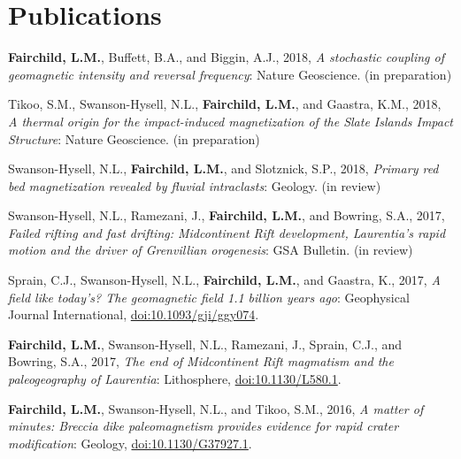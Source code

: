 \documentclass[11pt,a4paper,sans]{moderncv}
\begin{document}
\section{Publications}
\vspace{6pt}
\begin{etaremune}[itemsep=3pt]

    \item{\textbf{Fairchild, L.M.}, Buffett, B.A., and Biggin, A.J., 2018,
            \textit{A stochastic coupling of geomagnetic intensity and reversal
        frequency}: Nature Geoscience. (in preparation)}

    \item{Tikoo, S.M., Swanson-Hysell, N.L., \textbf{Fairchild, L.M.}, and
            Gaastra, K.M., 2018, \textit{A thermal origin for the impact-induced
            magnetization of the Slate Islands Impact Structure}: Nature
        Geoscience. (in preparation)}

    \item{Swanson-Hysell, N.L., \textbf{Fairchild, L.M.}, and Slotznick, S.P.,
            2018, \textit{Primary red bed magnetization revealed by fluvial
        intraclasts}: Geology. (in review)}

    \item{Swanson-Hysell, N.L., Ramezani, J., \textbf{Fairchild, L.M.}, and
            Bowring, S.A., 2017, \textit{Failed rifting and fast drifting:
                Midcontinent Rift
                development, Laurentia's rapid motion and the driver of
        Grenvillian orogenesis}: GSA Bulletin. (in review)}

    \item{Sprain, C.J., Swanson-Hysell, N.L., \textbf{Fairchild, L.M.}, and
            Gaastra, K., 2017, \textit{A field like today's? The geomagnetic
            field 1.1 billion years ago}: Geophysical Journal International,
            {\color{cyan}\href{https://doi.org/10.1093/gji/ggy074}
        {doi:10.1093/gji/ggy074}}.}

    \item{\textbf{Fairchild, L.M.}, Swanson-Hysell, N.L., Ramezani, J., Sprain,
            C.J., and Bowring, S.A., 2017, \textit{The end of Midcontinent Rift
            magmatism and the paleogeography of Laurentia}: Lithosphere,
            {\color{cyan}\href{https://doi.org/10.1130/L580.1}
        {doi:10.1130/L580.1}}.}

    \item{\textbf{Fairchild, L.M.}, Swanson-Hysell, N.L., and Tikoo, S.M., 2016,
            \textit{A matter of minutes: Breccia dike paleomagnetism provides
            evidence for rapid crater modification}: Geology,
            {\color{cyan}\href{https://doi.org/10.1130/G37927.1}
        {doi:10.1130/G37927.1}}.}


\end{etaremune}
\end{document}
